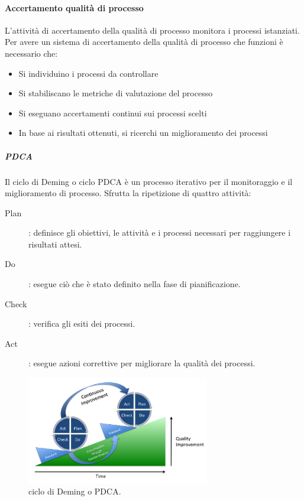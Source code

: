 \documentclass[../norme-di-progetto.tex]{subfiles}
\begin{document}
\paragraph{Accertamento qualità di processo}%
\label{par:accertamento qualita di processo}
L'attività di accertamento della qualità di processo monitora i processi istanziati. Per avere un sistema di accertamento della qualità di processo che funzioni è necessario che:

\begin{itemize}
  \item Si individuino i processi da controllare
  \item Si stabiliscano le metriche di valutazione del processo
  \item Si eseguano accertamenti continui sui processi scelti
  \item In base ai risultati ottenuti, si ricerchi un miglioramento dei processi
\end{itemize}

\subparagraph{PDCA}%
\label{subp:PDCA}
Il ciclo di Deming o ciclo PDCA è un processo iterativo per il monitoraggio e il miglioramento di processo. Sfrutta la ripetizione di quattro attività:

\begin{description}
  \item [Plan]: definisce gli obiettivi, le attività e i processi necessari per raggiungere i risultati attesi.
  \item [Do]: esegue ciò che è stato definito nella fase di pianificazione.
  \item [Check]: verifica gli esiti dei processi.
  \item [Act]: esegue azioni correttive per migliorare la qualità dei processi.
\end{description}
\begin{figure}[H]
  \includegraphics[width=8cm]{components/img/PDCA-process.png}
  \centering
  \caption{ciclo di Deming o PDCA.}
\end{figure}
\end{document}
